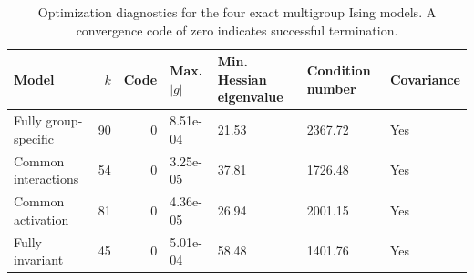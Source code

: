 \begin{table}

\caption{\label{tab:tab:appendix_optimization}Optimization diagnostics for the four exact multigroup Ising models. A convergence code of zero indicates successful termination.}
\centering
\begin{tabular}[t]{lrrllll}
\toprule
Model & $k$ & Code & Max. $|g|$ & Min. Hessian eigenvalue & Condition number & Covariance\\
\midrule
Fully group-specific & 90 & 0 & 8.51e-04 & 21.53 & 2367.72 & Yes\\
Common interactions & 54 & 0 & 3.25e-05 & 37.81 & 1726.48 & Yes\\
Common activation & 81 & 0 & 4.36e-05 & 26.94 & 2001.15 & Yes\\
Fully invariant & 45 & 0 & 5.01e-04 & 58.48 & 1401.76 & Yes\\
\bottomrule
\end{tabular}
\end{table}

